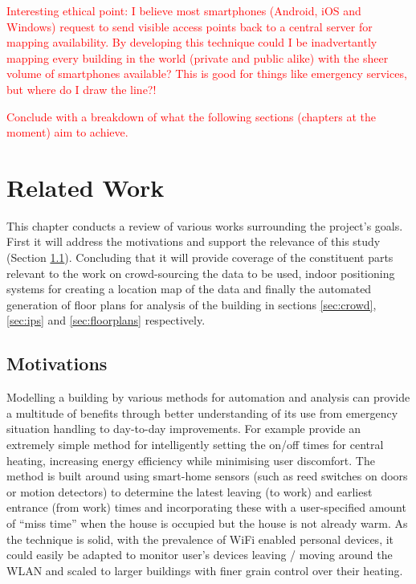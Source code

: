 \documentclass{UoYCSproject}
\begin{document}
        \textcolor{red}{Interesting ethical point: I believe most smartphones (Android, iOS and Windows) request to send visible access points back to a central server for mapping availability. By developing this technique could I be inadvertantly mapping every building in the world (private and public alike) with the sheer volume of smartphones available? This is good for things like emergency services, but where do I draw the line?!}
        
        \textcolor{red}{Conclude with a breakdown of what the following sections (chapters at the moment) aim to achieve.}
	
	\chapter{Related Work}
	
		This chapter conducts a review of various works surrounding the project's goals. First it will address the motivations and support the relevance of this study (Section \ref{sec:motivations}). Concluding that it will provide coverage of the constituent parts relevant to the work on crowd-sourcing the data to be used, indoor positioning systems for creating a location map of the data and finally the automated generation of floor plans for analysis of the building in sections \ref{sec:crowd}, \ref{sec:ips} and \ref{sec:floorplans} respectively.
        
        \section{Motivations}
        \label{sec:motivations}
        
            Modelling a building by various methods for automation and analysis can provide a multitude of benefits through better understanding of its use from emergency situation handling to day-to-day improvements. For example \citet{gao2009self} provide an extremely simple method for intelligently setting the on/off times for central heating, increasing energy efficiency while minimising user discomfort. The method is built around using smart-home sensors (such as reed switches on doors or motion detectors) to determine the latest leaving (to work) and earliest entrance (from work) times and incorporating these with a user-specified amount of ``miss time'' when the house is occupied but the house is not already warm. As the technique is solid, with the prevalence of WiFi enabled personal devices, it could easily be adapted to monitor user's devices leaving / moving around the WLAN and scaled to larger buildings with finer grain control over their heating.
            
\end{document}
